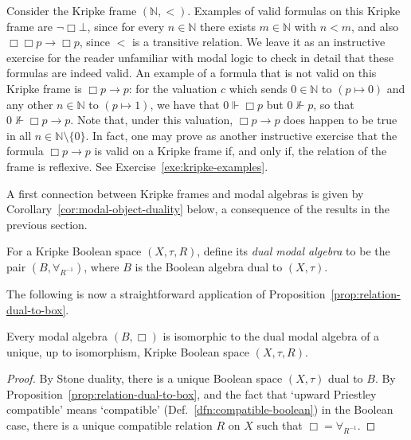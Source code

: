 \begin{example}\label{exa:kripkeframe}
Consider the Kripke frame $(\mathbb{N}, <)$. Examples of valid formulas on this Kripke frame are $\neg \Box \bot$, since for every $n \in \mathbb{N}$ there exists $m \in \mathbb{N}$ with $n < m$, and also $\Box \Box p \to \Box p$, since $<$ is a transitive relation. We leave it as an instructive exercise for the reader unfamiliar with modal logic to check in detail that these formulas are indeed valid. An example of a formula that is not valid on this Kripke frame is $\Box p \to p$: for the valuation $c$ which sends $0 \in \mathbb{N}$ to $(p \mapsto 0)$ and any other $n \in \mathbb{N}$ to $(p \mapsto 1)$, we have that $0 \Vdash \Box p$ but $0 \not\Vdash p$, so that $0 \not\Vdash \Box p \to p$. Note that, under this valuation, $\Box p \to p$ does happen to be true in all $n \in \mathbb{N} \setminus \{0\}$. In fact, one may prove as another instructive exercise that the formula $\Box p \to p$ is valid on a Kripke frame if, and only if, the relation of the frame is reflexive. See Exercise~\ref{exe:kripke-examples}.
\end{example}
A first connection between Kripke frames and modal algebras is given by Corollary~\ref{cor:modal-object-duality} below, a consequence of the results in the previous section.
\begin{definition}
	For a Kripke Boolean space $(X,\tau,R)$, define its \emph{dual modal algebra} to be the pair $(B,\forall_{R^{-1}})$, where $B$ is the Boolean algebra dual to $(X,\tau)$.
	\end{definition}
	The following is now a straightforward application of Proposition~\ref{prop:relation-dual-to-box}.
	\begin{corollary}\label{cor:modal-object-duality}
	Every modal algebra $(B, \Box)$ is isomorphic to the dual modal algebra of a unique, up to isomorphism, Kripke Boolean space $(X,\tau,R)$.
	\end{corollary}
	\begin{proof}
	By Stone duality, there is a unique Boolean space $(X,\tau)$ dual to $B$. By Proposition~\ref{prop:relation-dual-to-box}, and the fact that `upward Priestley compatible' means `compatible' (Def.~\ref{dfn:compatible-boolean}) in the Boolean case, there is a unique compatible relation $R$ on $X$ such that $\Box = \forall_{R^{-1}}$.
	\end{proof}

